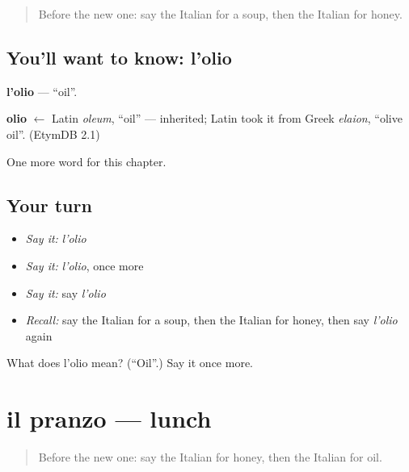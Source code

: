 \label{lesson:IT-C54-olio}



\begin{quote}
Before the new one: say the Italian for a soup, then the Italian for honey.
\end{quote}

\subsection*{You'll want to know: l'olio}
\textbf{l'olio} — \textquotedblleft{}oil\textquotedblright{}.

\begin{cousinweb}
\textbf{olio} $\leftarrow$ Latin \emph{oleum}, \textquotedblleft{}oil\textquotedblright{} — inherited; Latin took it from Greek \emph{elaion}, \textquotedblleft{}olive oil\textquotedblright{}. (EtymDB 2.1)
\end{cousinweb}

\begin{grammarlens}[title={What you've built}]
One more word for this chapter.
\end{grammarlens}

\subsection*{Your turn}
\begin{itemize}
\raggedright
  \item \emph{Say it:} \emph{l'olio}
  \item \emph{Say it:} \emph{l'olio}, once more
  \item \emph{Say it:} say \emph{l'olio}
  \item \emph{Recall:} say the Italian for a soup, then the Italian for honey, then say \emph{l'olio} again
\end{itemize}

\begin{tcolorbox}[breakable,colback=teal!4,colframe=teal!35!black,title={Before you move on}]
What does l'olio mean? (\textquotedblleft{}Oil\textquotedblright{}.) Say it once more.
\end{tcolorbox}
\section[il pranzo]{il pranzo — lunch}

\label{lesson:IT-C54-pranzo}



\begin{quote}
Before the new one: say the Italian for honey, then the Italian for oil.
\end{quote}


